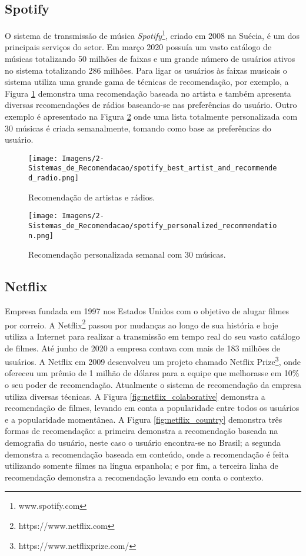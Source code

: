 \subsection{Spotify}
O sistema de transmissão de música \textit{Spotify}\footnote{www.spotify.com}, criado em 2008 na Suécia, é um dos principais serviços do setor. Em março 2020 possuía um vasto catálogo de músicas totalizando 50 milhões de faixas e um grande número de usuários ativos no sistema totalizando 286 milhões. Para ligar os usuários às faixas musicais o sistema utiliza uma grande gama de técnicas de recomendação, por exemplo, a Figura \ref{fig:spotify_best_artist_and_recommended_radio} demonstra uma recomendação baseada no artista e também apresenta diversas recomendações de rádios baseando-se nas preferências do usuário. Outro exemplo é apresentado na Figura \ref{fig:spotify_personalized_recommendation} onde uma lista totalmente personalizada com 30 músicas é criada semanalmente, tomando como base as preferências do usuário.

\begin{figure}[hbt!]
    \centering
    \texttt{[image: Imagens/2-Sistemas\_de\_Recomendacao/spotify\_best\_artist\_and\_recommended\_radio.png]}
    \caption{Recomendação de artistas e rádios.}
    \label{fig:spotify_best_artist_and_recommended_radio}
\end{figure}

\begin{figure}[hbt!]
    \centering
    \texttt{[image: Imagens/2-Sistemas\_de\_Recomendacao/spotify\_personalized\_recommendation.png]}
    \caption{Recomendação personalizada semanal com 30 músicas.}
    \label{fig:spotify_personalized_recommendation}
\end{figure}

\subsection{Netflix}
Empresa fundada em 1997 nos Estados Unidos com o objetivo de alugar filmes por correio. A Netflix\footnote{https://www.netflix.com} passou por mudanças ao longo de sua história e hoje utiliza a Internet para realizar a transmissão em tempo real do seu vasto catálogo de filmes. Até junho de 2020 a empresa contava com mais de 183 milhões de usuários. A Netflix em 2009 desenvolveu um projeto chamado Netflix Prize\footnote{https://www.netflixprize.com/}, onde ofereceu um prêmio de 1 milhão de dólares para a equipe que melhorasse em 10\% o seu poder de recomendação. Atualmente o sistema de recomendação da empresa utiliza diversas técnicas. A Figura \ref{fig:netflix_colaborative} demonstra a recomendação de filmes, levando em conta a popularidade entre todos os usuários e a popularidade momentânea. A Figura \ref{fig:netflix_country} demonstra três formas de recomendação: a primeira demonstra a recomendação baseada na demografia do usuário, neste caso o usuário encontra-se no Brasil; a segunda demonstra a recomendação baseada em conteúdo, onde a recomendação é feita utilizando somente filmes na língua espanhola; e por fim, a terceira linha de recomendação demonstra a recomendação levando em conta o contexto.

